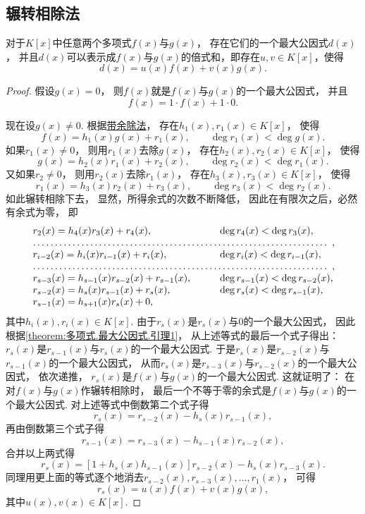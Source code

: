 \subsection{辗转相除法}
\begin{theorem}\label{theorem:多项式.辗转相除法}
对于\(K[x]\)中任意两个多项式\(f(x)\)与\(g(x)\)，
存在它们的一个最大公因式\(d(x)\)，
并且\(d(x)\)可以表示成\(f(x)\)与\(g(x)\)的倍式和，即存在\(u,v \in K[x]\)，使得\[
	d(x) = u(x) f(x) + v(x) g(x).
\]
\begin{proof}
假设\(g(x)=0\)，
则\(f(x)\)就是\(f(x)\)与\(g(x)\)的一个最大公因式，
并且\[
	f(x) = 1 \cdot f(x) + 1 \cdot 0.
\]

现在设\(g(x)\neq0\).
根据\hyperref[theorem:多项式.带余除法]{带余除法}，
存在\(h_1(x),r_1(x) \in K[x]\)，
使得\[
	f(x) = h_1(x) g(x) + r_1(x), \qquad
	\deg r_1(x) < \deg g(x).
\]
如果\(r_1(x)\neq0\)，
则用\(r_1(x)\)去除\(g(x)\)，
存在\(h_2(x),r_2(x) \in K[x]\)，
使得\[
	g(x) = h_2(x) r_1(x) + r_2(x), \qquad
	\deg r_2(x) < \deg r_1(x).
\]
又如果\(r_2\neq0\)，
则用\(r_2(x)\)去除\(r_1(x)\)，
存在\(h_3(x),r_3(x) \in K[x]\)，
使得\[
	r_1(x) = h_3(x) r_2(x) + r_3(x), \qquad
	\deg r_3(x) < \deg r_2(x).
\]
如此辗转相除下去，
显然，所得余式的次数不断降低，
因此在有限次之后，必然有余式为零，
即\[\begin{array}{ll}
	r_2(x) = h_4(x) r_3(x) + r_4(x), \qquad
		&\deg r_4(x) < \deg r_3(x), \\
	\hdotsfor{2}, \\
	r_{i-2}(x) = h_i(x) r_{i-1}(x) + r_i(x), \qquad
		&\deg r_i(x) < \deg r_{i-1}(x), \\
	\hdotsfor{2}, \\
	r_{s-3}(x) = h_{s-1}(x) r_{s-2}(x) + r_{s-1}(x), \qquad
		&\deg r_{s-1}(x) < \deg r_{s-2}(x), \\
	r_{s-2}(x) = h_s(x) r_{s-1}(x) + r_s(x), \qquad
		&\deg r_s(x) < \deg r_{s-1}(x), \\
	r_{s-1}(x) = h_{s+1}(x) r_s(x) + 0,
\end{array}\]
其中\(h_i(x),r_i(x) \in K[x]\).
由于\(r_s(x)\)是\(r_s(x)\)与\(0\)的一个最大公因式，
因此根据\cref{theorem:多项式.最大公因式.引理1}，
从上述等式的最后一个式子得出：
\(r_s(x)\)是\(r_{s-1}(x)\)与\(r_s(x)\)的一个最大公因式.
于是\(r_s(x)\)是\(r_{s-2}(x)\)与\(r_{s-1}(x)\)的一个最大公因式，
从而\(r_s(x)\)是\(r_{s-3}(x)\)与\(r_{s-2}(x)\)的一个最大公因式，
依次递推，
\(r_s(x)\)是\(f(x)\)与\(g(x)\)的一个最大公因式.
这就证明了：
在对\(f(x)\)与\(g(x)\)作辗转相除时，
最后一个不等于零的余式是\(f(x)\)与\(g(x)\)的一个最大公因式.
对上述等式中倒数第二个式子得\[
	r_s(x) = r_{s-2}(x) - h_s(x) r_{s-1}(x),
\]
再由倒数第三个式子得\[
	r_{s-1}(x) = r_{s-3}(x) - h_{s-1}(x) r_{s-2}(x),
\]
合并以上两式得\[
	r_s(x) = [1 + h_s(x) h_{s-1}(x)] r_{s-2}(x) - h_s(x) r_{s-3}(x).
\]
同理用更上面的等式逐个地消去\(r_{s-2}(x),r_{s-3}(x),\dotsc,r_1(x)\)，
可得\[
	r_s(x) = u(x) f(x) + v(x) g(x),
\]
其中\(u(x),v(x) \in K[x]\).
\end{proof}
\end{theorem}

